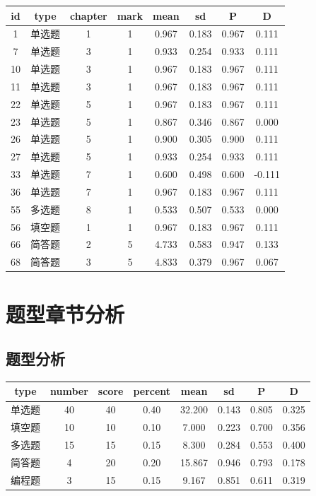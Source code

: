 \documentclass[hyperref,adobefonts]{ctexart}
\begin{document}
\begin{longtable}{c|c|c|c|c|c|c|c}
\hline
id & type & chapter & mark & mean & sd & P & D\\
\hline
1 & 单选题 & 1 & 1 & 0.967 & 0.183 & 0.967 & 0.111\\
\hline
7 & 单选题 & 3 & 1 & 0.933 & 0.254 & 0.933 & 0.111\\
\hline
10 & 单选题 & 3 & 1 & 0.967 & 0.183 & 0.967 & 0.111\\
\hline
11 & 单选题 & 3 & 1 & 0.967 & 0.183 & 0.967 & 0.111\\
\hline
22 & 单选题 & 5 & 1 & 0.967 & 0.183 & 0.967 & 0.111\\
\hline
23 & 单选题 & 5 & 1 & 0.867 & 0.346 & 0.867 & 0.000\\
\hline
26 & 单选题 & 5 & 1 & 0.900 & 0.305 & 0.900 & 0.111\\
\hline
27 & 单选题 & 5 & 1 & 0.933 & 0.254 & 0.933 & 0.111\\
\hline
33 & 单选题 & 7 & 1 & 0.600 & 0.498 & 0.600 & -0.111\\
\hline
36 & 单选题 & 7 & 1 & 0.967 & 0.183 & 0.967 & 0.111\\
\hline
55 & 多选题 & 8 & 1 & 0.533 & 0.507 & 0.533 & 0.000\\
\hline
56 & 填空题 & 1 & 1 & 0.967 & 0.183 & 0.967 & 0.111\\
\hline
66 & 简答题 & 2 & 5 & 4.733 & 0.583 & 0.947 & 0.133\\
\hline
68 & 简答题 & 3 & 5 & 4.833 & 0.379 & 0.967 & 0.067\\
\hline
\end{longtable}

\section{题型章节分析}

\subsection{题型分析}

\begin{longtable}{c|c|c|c|c|c|c|c}
\hline
type & number & score & percent & mean & sd & P & D\\
\hline
单选题 & 40 & 40 & 0.40 & 32.200 & 0.143 & 0.805 & 0.325\\
\hline
填空题 & 10 & 10 & 0.10 & 7.000 & 0.223 & 0.700 & 0.356\\
\hline
多选题 & 15 & 15 & 0.15 & 8.300 & 0.284 & 0.553 & 0.400\\
\hline
简答题 & 4 & 20 & 0.20 & 15.867 & 0.946 & 0.793 & 0.178\\
\hline
编程题 & 3 & 15 & 0.15 & 9.167 & 0.851 & 0.611 & 0.319\\
\hline
\end{longtable}
\end{document}
